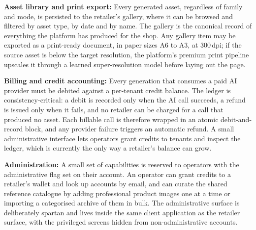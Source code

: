 \textbf{Asset library and print export:} Every generated asset, regardless of family and mode, is persisted to the retailer's gallery, where it can be browsed and filtered by asset type, by date and by name. The gallery is the canonical record of everything the platform has produced for the shop. Any gallery item may be exported as a print-ready document, in paper sizes A6 to A3, at $300\,$dpi; if the source asset is below the target resolution, the platform's premium print pipeline upscales it through a learned super-resolution model before laying out the page.

\textbf{Billing and credit accounting:} Every generation that consumes a paid AI provider must be debited against a per-tenant credit balance. The ledger is consistency-critical: a debit is recorded only when the AI call succeeds, a refund is issued only when it fails, and no retailer can be charged for a call that produced no asset. Each billable call is therefore wrapped in an atomic debit-and-record block, and any provider failure triggers an automatic refund. A small administrative interface lets operators grant credits to tenants and inspect the ledger, which is currently the only way a retailer's balance can grow.

\textbf{Administration:} A small set of capabilities is reserved to operators with the administrative flag set on their account. An operator can grant credits to a retailer's wallet and look up accounts by email, and can curate the shared reference catalogue by adding professional product images one at a time or importing a categorised archive of them in bulk. The administrative surface is deliberately spartan and lives inside the same client application as the retailer surface, with the privileged screens hidden from non-administrative accounts.

